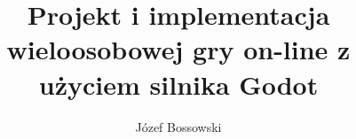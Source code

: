 \documentclass[inzynier,druk]{dyplom}
\author{Józef Bossowski}
\title{Projekt i implementacja wieloosobowej gry on-line z użyciem silnika Godot}
\begin{document}
\maketitle



\tableofcontents










\listoffigures
\listoflistings
\listoftables

\appendixpage
\appendix

\end{document}
